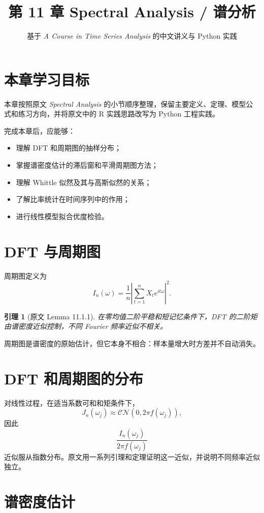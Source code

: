 \documentclass[11pt,a4paper]{ctexart}
\title{第 11 章 \quad Spectral Analysis / 谱分析}
\author{基于 \textit{A Course in Time Series Analysis} 的中文讲义与 Python 实践}
\date{}
\newtheorem{lemma}{引理}[section]
\begin{document}
\maketitle

\section*{本章学习目标}

本章按照原文 \textit{Spectral Analysis} 的小节顺序整理，保留主要定义、定理、模型公式和练习方向，并将原文中的 R 实践思路改写为 Python 工程实践。

完成本章后，应能够：
\begin{itemize}
  \item 理解 DFT 和周期图的抽样分布；
  \item 掌握谱密度估计的滞后窗和平滑周期图方法；
  \item 理解 Whittle 似然及其与高斯似然的关系；
  \item 了解比率统计在时间序列中的作用；
  \item 进行线性模型拟合优度检验。
\end{itemize}

\section{DFT 与周期图}

周期图定义为
\[
  I_n(\omega)=\frac1n\left|\sum_{t=1}^n X_t e^{it\omega}\right|^2.
\]
\begin{lemma}[原文 Lemma 11.1.1]
在零均值二阶平稳和短记忆条件下，DFT 的二阶矩由谱密度近似控制，不同 Fourier 频率近似不相关。
\end{lemma}

周期图是谱密度的原始估计，但它本身不相合：样本量增大时方差并不自动消失。

\section{DFT 和周期图的分布}

对线性过程，在适当系数可和和矩条件下，
\[
  J_n(\omega_j)\approx \mathcal{CN}(0,2\pi f(\omega_j)),
\]
因此
\[
  \frac{I_n(\omega_j)}{2\pi f(\omega_j)}
\]
近似服从指数分布。原文用一系列引理和定理证明这一近似，并说明不同频率近似独立。

\section{谱密度估计}
\end{document}
